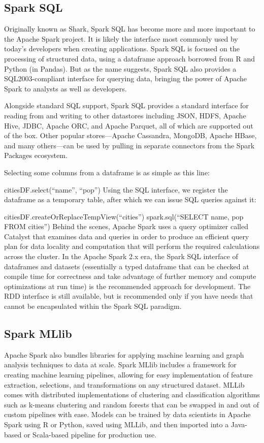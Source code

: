 \documentclass[a4paper,12pt]{article}
\begin{document}
\subsection{Spark SQL}

Originally known as Shark, Spark SQL has become more and more important to the Apache Spark project. It is likely the interface most commonly used by today’s developers when creating applications. Spark SQL is focused on the processing of structured data, using a dataframe approach borrowed from R and Python (in Pandas). But as the name suggests, Spark SQL also provides a SQL2003-compliant interface for querying data, bringing the power of Apache Spark to analysts as well as developers.

Alongside standard SQL support, Spark SQL provides a standard interface for reading from and writing to other datastores including JSON, HDFS, Apache Hive, JDBC, Apache ORC, and Apache Parquet, all of which are supported out of the box. Other popular stores—Apache Cassandra, MongoDB, Apache HBase, and many others—can be used by pulling in separate connectors from the Spark Packages ecosystem.

Selecting some columns from a dataframe is as simple as this line:

citiesDF.select(“name”, “pop”)
Using the SQL interface, we register the dataframe as a temporary table, after which we can issue SQL queries against it:

citiesDF.createOrReplaceTempView(“cities”)
spark.sql(“SELECT name, pop FROM cities”)
Behind the scenes, Apache Spark uses a query optimizer called Catalyst that examines data and queries in order to produce an efficient query plan for data locality and computation that will perform the required calculations across the cluster. In the Apache Spark 2.x era, the Spark SQL interface of dataframes and datasets (essentially a typed dataframe that can be checked at compile time for correctness and take advantage of further memory and compute optimizations at run time) is the recommended approach for development. The RDD interface is still available, but is recommended only if you have needs that cannot be encapsulated within the Spark SQL paradigm.

\subsection{Spark MLlib}

Apache Spark also bundles libraries for applying machine learning and graph analysis techniques to data at scale. Spark MLlib includes a framework for creating machine learning pipelines, allowing for easy implementation of feature extraction, selections, and transformations on any structured dataset. MLLib comes with distributed implementations of clustering and classification algorithms such as k-means clustering and random forests that can be swapped in and out of custom pipelines with ease. Models can be trained by data scientists in Apache Spark using R or Python, saved using MLLib, and then imported into a Java-based or Scala-based pipeline for production use.
\end{document}
